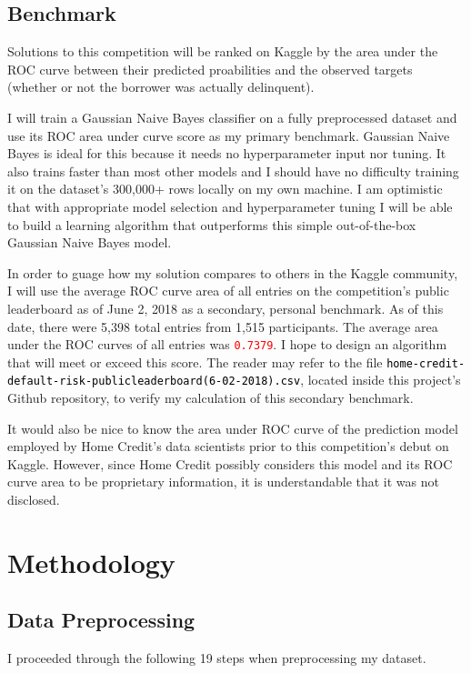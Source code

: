 \documentclass[12pt, letterpaper]{article}
\begin{document}
\subsection{Benchmark}
Solutions to this competition will be ranked on Kaggle by the area under the ROC curve between their predicted proabilities and the observed targets (whether or not the borrower was actually delinquent).

I will train a Gaussian Naive Bayes classifier on a fully preprocessed dataset and use its ROC area under curve score as my primary benchmark. Gaussian Naive Bayes is ideal for this because it needs no hyperparameter input nor tuning. It also trains faster than most other models and I should have no difficulty training it on the dataset's 300,000+ rows locally on my own machine. I am optimistic that with appropriate model selection and hyperparameter tuning I will be able to build a learning algorithm that outperforms this simple out-of-the-box Gaussian Naive Bayes model.

In order to guage how my solution compares to others in the Kaggle community, I will use the average ROC curve area of all entries on the competition's public leaderboard\cite{kagglehomecreditcompetitionpublicleaderboard} as of June 2, 2018 as a secondary, personal benchmark. As of this date, there were 5,398 total entries from 1,515 participants. The average area under the ROC curves of all entries was \colorbox{backcolor}{\textcolor{red}{\texttt{0.7379}}}. I hope to design an algorithm that will meet or exceed this score. The reader may refer to the file \colorbox{backcolor}{\textcolor{black}{\texttt{home-credit-default-risk-publicleaderboard(6-02-2018).csv}}}, located inside this project's Github repository\cite{githubprojectrepo}, to verify my calculation of this secondary benchmark.

It would also be nice to know the area under ROC curve of the prediction model employed by Home Credit's data scientists prior to this competition's debut on Kaggle. However, since Home Credit possibly considers this model and its ROC curve area to be proprietary information, it is understandable that it was not disclosed.

\section{Methodology}
\subsection{Data Preprocessing}
I proceeded through the following 19 steps when preprocessing my dataset.
\end{document}
